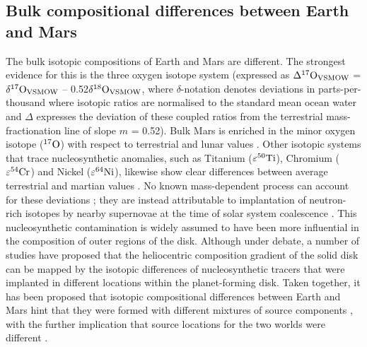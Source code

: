 \documentclass{aa}
\begin{document}
\subsection{Bulk compositional differences between Earth and Mars}
\label{subsec:comp_diff}
The bulk isotopic compositions of Earth and Mars are different. The strongest evidence for this is the three oxygen isotope system (expressed as $\Delta^{17} \rm O_{\rm VSMOW}$ = $\delta^{17} \rm O_{\rm VSMOW}$ -- 0.52$\delta^{18} \rm O_{\rm VSMOW}$, where $\delta$-notation denotes deviations in parts-per-thousand where isotopic ratios are normalised to the standard mean ocean water and $\Delta$ expresses the deviation of these coupled ratios from the terrestrial mass-fractionation line of slope $m$ = 0.52). Bulk Mars is enriched in the minor oxygen isotope ($^{17} \rm O$) with respect to terrestrial and lunar values \citep[e.g.][]{franchi1999oxygen,rubin2000angeles,mittlefehldt2008oxygen,agee2013unique,wittmann2015petrography}. Other isotopic systems that trace nucleosynthetic anomalies, such as Titanium ($\varepsilon^{50} \rm Ti$), Chromium ($\varepsilon^{54} \rm Cr$) and Nickel ($\varepsilon^{64} \rm Ni$), likewise show clear differences between average terrestrial and martian values \citep{brasser2017cool}. No known mass-dependent process can account for these deviations \citep{qin2016nucleosynthetic}; they are instead attributable to implantation of neutron-rich isotopes by nearby supernovae at the time of solar system coalescence \citep{qin2010contributors}. This nucleosynthetic contamination is widely assumed to have been more influential in the composition of outer regions of the disk. Although under debate, a number of studies have proposed that the heliocentric composition gradient of the solid disk can be mapped by the isotopic differences of nucleosynthetic tracers that were implanted in different locations within the planet-forming disk. Taken together, it has been proposed that isotopic compositional differences between Earth and Mars hint that they were formed with different mixtures of source components \citep{wanke1988chemical,wanke1994chemistry,lodders2000oxygen,warren2011stable}, with the further implication that source locations for the two worlds were different \citep[cf.][]{fitoussi2016building}.
\end{document}
